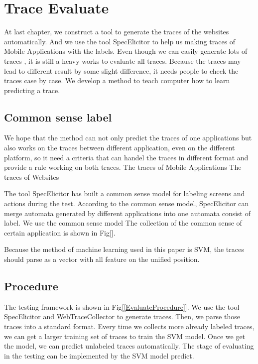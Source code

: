
\chapter{Trace Evaluate}\label{ch:traceEvaluate}

At last chapter, we construct a tool to generate the traces of the websites automatically.
And we use the tool SpecElicitor to help us making traces of Mobile Applications with the labels.
Even though we can easily generate lots of traces ,
it is still a heavy works to evaluate all traces.
Because the traces may lead to different result by some slight difference,
it needs people to check the traces case by case.
We develop a method to teach computer how to learn predicting a trace.


\section{Common sense label}

We hope that the method can not only predict the traces of one applications but also works on the traces between different application, even on the different platform,
so it need a criteria that can handel the traces in different format and provide a rule working on both traces.
The traces of Mobile Applications
The traces of Websites

The tool SpecElicitor has built a common sense model for labeling screens and actions during the test.
According to the common sense model, SpecElicitor can merge automata generated by different applications into one automata consist of label.
We use the common sense model 
The collection of the common sense of certain application is shown in Fig[].


Because the method of machine learning used in this paper is SVM,
the traces should parse as a vector with all feature on the unified position.



\clearpage

\section{Procedure}

The testing framework is shown in Fig[\ref{EvaluateProcedure}].
We use the tool SpecElicitor and WebTraceCollector to generate traces.
Then, we parse those traces into a standard format.
Every time we collects more already labeled traces,
we can get a larger training set of traces to train the SVM model.
Once we get the model, we can predict unlabeled traces automatically.
The stage of evaluating in the testing can be implemented by the SVM model predict.



